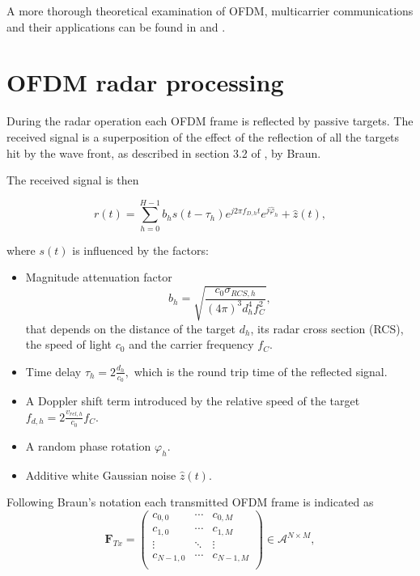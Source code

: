 
A more thorough theoretical examination of OFDM, multicarrier communications and their applications can be found in \cite{OFDMWireless} and \cite{Proakis_2001}.


\section{OFDM radar processing}
        
    During the radar operation each OFDM frame is reflected by passive targets. The received signal is a superposition of the effect of the reflection of all the targets hit by the wave front, as described in section 3.2 of \cite{Braun2014OFDMRA}, by Braun.
    
    The received signal is then
    
    \begin{equation}
    \label{eq:received_signal_mltiple_targets}
        r(t) = \sum_{h=0}^{H-1} b_h s(t-\tau_h)e^{j2\pi f_{D,h}t}e^{j\hat{\varphi}_h} + \hat{z}(t),
    \end{equation}
    
    where $s(t)$ is influenced by the factors:
    
    \begin{itemize}
        \item Magnitude attenuation factor $$b_h = \sqrt{\frac{c_0\sigma_{RCS,h}}{(4\pi)^3 d_h^4f_C^2}},$$
    that depends on the distance of the target $d_h$, its radar cross section (RCS), the speed of light $c_0$ and the carrier frequency $f_C$.
    
        \item Time delay $\tau_h = 2\frac{d_h}{c_0},$ which is the round trip time of the reflected signal.
    
        \item A Doppler shift term introduced by the relative speed of the target $f_{d,h} = 2 \frac{v_{rel,h}}{c_0}f_C$.
        \item A random phase rotation $\varphi_h$.
        \item Additive white Gaussian noise $\hat{z}(t)$.
    \end{itemize}
    
    Following Braun's notation each transmitted OFDM frame is indicated as
    \begin{equation}
        \mathbf F_{Tx} = \begin{pmatrix}
            c_{0,0} & \cdots & c_{0,M} \\
            c_{1,0} & \cdots & c_{1,M} \\
            \vdots   & \ddots & \vdots \\
            c_{N-1, 0} & \cdots & c_{N-1, M} \\
        \end{pmatrix} \in \mathcal{A}^{N\times M},
    \end{equation}
    
